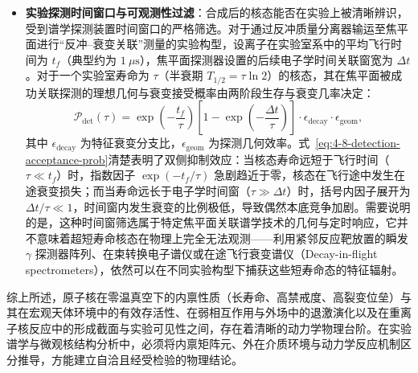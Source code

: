 \begin{itemize}
\begin{equation}\label{eq:4-8-beff-def}
b_{\mathrm{eff}} \equiv \frac{\sum_{J_0} \sigma_{\mathrm{ER}}(E, J_0) \bar{b}_{\mathrm{feed}}(E, J_0)}{\sum_{J_0} \sigma_{\mathrm{ER}}(E, J_0)}
\end{equation}
严格是全分波剩余核产生截面加权的系综平均值（分母要求总剩余截面非零）。若反应进入通道角动量输入偏低，使得进入态系综的自旋分布无法有效重叠到高自旋异能态的侧线馈入带上，大部分级联流将旁路流向低自旋基态，使得该异能态的有效截面受到严重抑制。
\item \textbf{实验探测时间窗口与可观测性过滤}：合成后的核态能否在实验上被清晰辨识，受到谱学探测装置时间窗口的严格筛选。对于通过反冲质量分离器输运至焦平面进行“反冲--衰变关联”测量的实验构型，设离子在实验室系中的平均飞行时间为 $t_f$（典型约为 $1\ \mu\mathrm{s}$），焦平面探测器设置的后续电子学时间关联窗宽为 $\Delta t$。对于一个实验室寿命为 $\tau$（半衰期 $T_{1/2} = \tau \ln 2$）的核态，其在焦平面被成功关联探测的理想几何与衰变接受概率由两阶段生存与衰变几率决定：
\begin{equation}\label{eq:4-8-detection-acceptance-prob}
\mathcal{P}_{\mathrm{det}}(\tau) = \exp\left(-\frac{t_f}{\tau}\right) \left[ 1 - \exp\left(-\frac{\Delta t}{\tau}\right) \right] \cdot \epsilon_{\mathrm{decay}} \cdot \epsilon_{\mathrm{geom}},
\end{equation}
其中 $\epsilon_{\mathrm{decay}}$ 为特征衰变分支比，$\epsilon_{\mathrm{geom}}$ 为探测几何效率。式~\eqref{eq:4-8-detection-acceptance-prob}清楚表明了双侧抑制效应：当核态寿命远短于飞行时间（$\tau \ll t_f$）时，指数因子 $\exp(-t_f/\tau)$ 急剧趋近于零，核态在飞行途中发生在途衰变损失；而当寿命远长于电子学时间窗（$\tau \gg \Delta t$）时，括号内因子展开为 $\Delta t / \tau \ll 1$，时间窗内发生衰变的比例极低，导致偶然本底竞争加剧。需要说明的是，这种时间窗筛选属于特定焦平面关联谱学技术的几何与定时响应，它并不意味着超短寿命核态在物理上完全无法观测——利用紧邻反应靶放置的瞬发 $\gamma$ 探测器阵列、在束转换电子谱仪或在途飞行衰变谱仪（Decay-in-flight spectrometers），依然可以在不同实验构型下捕获这些短寿命态的特征辐射。
\end{itemize}

综上所述，原子核在零温真空下的内禀性质（长寿命、高禁戒度、高裂变位垒）与其在宏观天体环境中的有效存活性、在弱相互作用与外场中的退激演化以及在重离子核反应中的形成截面与实验可见性之间，存在着清晰的动力学物理台阶。在实验谱学与微观核结构分析中，必须将内禀矩阵元、外在介质环境与动力学反应机制区分推导，方能建立自洽且经受检验的物理结论。
